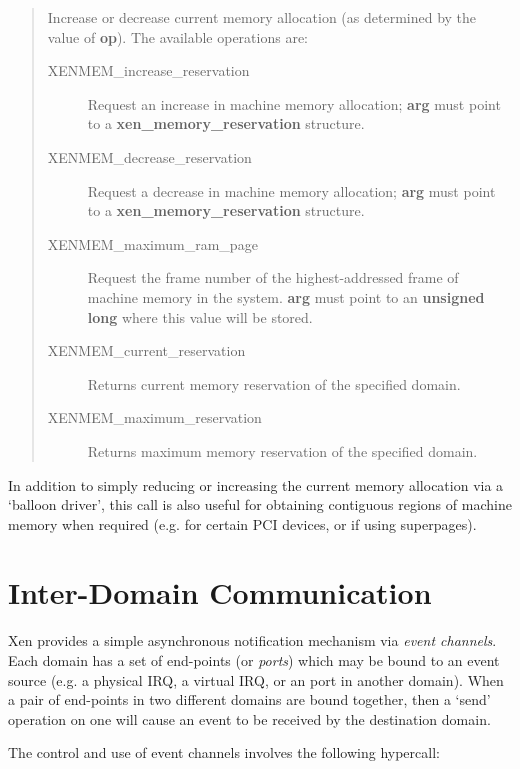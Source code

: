 \documentclass[11pt,twoside,final,openright]{report}
\newcommand{\hypercall}[1]{\vspace{2mm}{\sf #1}}
\begin{document}
\begin{quote} 
\hypercall{memory\_op(unsigned int op, void *arg)}

Increase or decrease current memory allocation (as determined by 
the value of {\bf op}).  The available operations are:

\begin{description}
\item[XENMEM\_increase\_reservation] Request an increase in machine
  memory allocation; {\bf arg} must point to a {\bf
  xen\_memory\_reservation} structure.
\item[XENMEM\_decrease\_reservation] Request a decrease in machine
  memory allocation; {\bf arg} must point to a {\bf
  xen\_memory\_reservation} structure.
\item[XENMEM\_maximum\_ram\_page] Request the frame number of the
  highest-addressed frame of machine memory in the system.  {\bf arg}
  must point to an {\bf unsigned long} where this value will be
  stored.
\item[XENMEM\_current\_reservation] Returns current memory reservation
  of the specified domain.
\item[XENMEM\_maximum\_reservation] Returns maximum memory reservation
  of the specified domain.
\end{description}

\end{quote} 

In addition to simply reducing or increasing the current memory
allocation via a `balloon driver', this call is also useful for 
obtaining contiguous regions of machine memory when required (e.g. 
for certain PCI devices, or if using superpages).  


\section{Inter-Domain Communication}
\label{s:idc} 

Xen provides a simple asynchronous notification mechanism via
\emph{event channels}. Each domain has a set of end-points (or
\emph{ports}) which may be bound to an event source (e.g. a physical
IRQ, a virtual IRQ, or an port in another domain). When a pair of
end-points in two different domains are bound together, then a `send'
operation on one will cause an event to be received by the destination
domain.

The control and use of event channels involves the following hypercall: 
\end{document}
